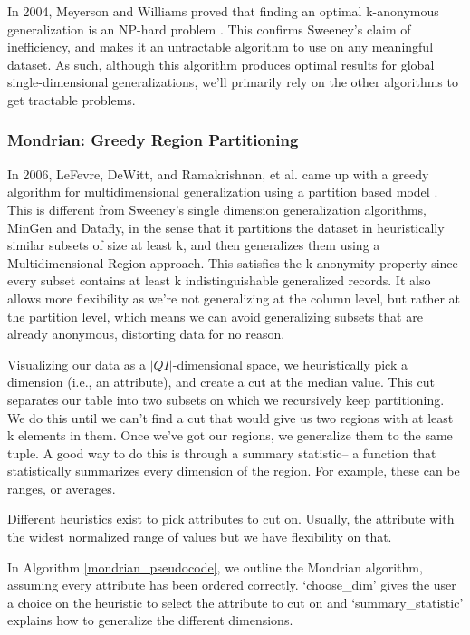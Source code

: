 In 2004, Meyerson and Williams proved that finding an optimal k-anonymous generalization is an NP-hard problem \cite{meyerson2004complexity}. This confirms Sweeney's claim of inefficiency, and makes it an untractable algorithm to use on any meaningful dataset. As such, although this algorithm produces optimal results for global single-dimensional generalizations, we'll primarily rely on the other algorithms to get tractable problems.


\subsubsection{Mondrian: Greedy Region Partitioning}
In 2006, LeFevre, DeWitt, and Ramakrishnan, et al. came up with a greedy algorithm for multidimensional generalization using a partition based model \cite{mondrian}. This is different from Sweeney's single dimension generalization algorithms, MinGen and Datafly, in the sense that it partitions the dataset in heuristically similar subsets of size at least k, and then generalizes them using a Multidimensional Region approach. This satisfies the k-anonymity property since every subset contains at least k indistinguishable generalized records. It also allows more flexibility as we're not generalizing at the column level, but rather at the partition level, which means we can avoid generalizing subsets that are already anonymous, distorting data for no reason. 

Visualizing our data as a $|QI|$-dimensional space, we heuristically pick a dimension (i.e., an attribute), and create a cut at the median value. This cut separates our table into two subsets on which we recursively keep partitioning. We do this until we can't find a cut that would give us two regions with at least k elements in them. Once we've got our regions, we generalize them to the same tuple. A good way to do this is through a summary statistic-- a function that statistically summarizes every dimension of the region. For example, these can be ranges, or averages.

Different heuristics exist to pick attributes to cut on. Usually, the attribute with the widest normalized range of values but we have flexibility on that.

In Algorithm \ref{mondrian_pseudocode}, we outline the Mondrian algorithm, assuming every attribute has been ordered correctly. `choose\_dim' gives the user a choice on the heuristic to select the attribute to cut on and `summary\_statistic' explains how to generalize the different dimensions.

